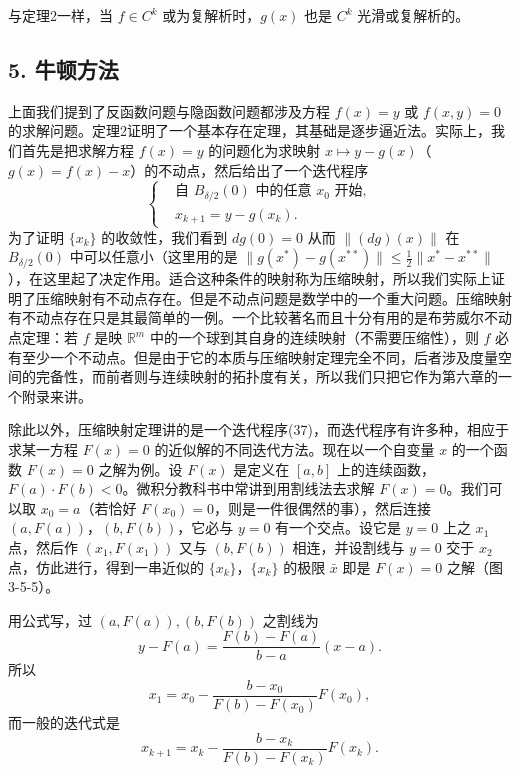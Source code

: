 与定理2一样，当 $f\in C^k$ 或为复解析时，$g(x)$ 也是 $C^k$ 光滑或复解析的。

\subsection*{5. 牛顿方法}

上面我们提到了反函数问题与隐函数问题都涉及方程 $f(x)=y$ 或 $f(x,y)=0$ 的求解问题。定理2证明了一个基本存在定理，其基础是逐步逼近法。实际上，我们首先是把求解方程 $f(x)=y$ 的问题化为求映射 $x\mapsto y-g(x)$（$g(x)=f(x)-x$）的不动点，然后给出了一个迭代程序
\begin{equation}
 \left\{
 \begin{aligned}
 &\text{自 }B_{\delta/2}(0)\text{ 中的任意 }x_0\text{ 开始},\\
 &x_{k+1}=y-g(x_k).
 \end{aligned}
 \right.
 \tag{37}
\end{equation}
为了证明 $\{x_k\}$ 的收敛性，我们看到 $dg(0)=0$ 从而 $\|(dg)(x)\|$ 在 $B_{\delta/2}(0)$ 中可以任意小（这里用的是 $\|g(x^*)-g(x^{**})\|\le\frac12\|x^*-x^{**}\|$），在这里起了决定作用。适合这种条件的映射称为压缩映射，所以我们实际上证明了压缩映射有不动点存在。但是不动点问题是数学中的一个重大问题。压缩映射有不动点存在只是其最简单的一例。一个比较著名而且十分有用的是布劳威尔不动点定理：若 $f$ 是映 $\mathbb R^m$ 中的一个球到其自身的连续映射（不需要压缩性），则 $f$ 必有至少一个不动点。但是由于它的本质与压缩映射定理完全不同，后者涉及度量空间的完备性，而前者则与连续映射的拓扑度有关，所以我们只把它作为第六章的一个附录来讲。

除此以外，压缩映射定理讲的是一个迭代程序(37)，而迭代程序有许多种，相应于求某一方程 $F(x)=0$ 的近似解的不同迭代方法。现在以一个自变量 $x$ 的一个函数 $F(x)=0$ 之解为例。设 $F(x)$ 是定义在 $[a,b]$ 上的连续函数，$F(a)\cdot F(b)<0$。微积分教科书中常讲到用割线法去求解 $F(x)=0$。我们可以取 $x_0=a$（若恰好 $F(x_0)=0$，则是一件很偶然的事），然后连接 $(a,F(a))$，$(b,F(b))$，它必与 $y=0$ 有一个交点。设它是 $y=0$ 上之 $x_1$ 点，然后作 $(x_1,F(x_1))$ 又与 $(b,F(b))$ 相连，并设割线与 $y=0$ 交于 $x_2$ 点，仿此进行，得到一串近似的 $\{x_k\}$，$\{x_k\}$ 的极限 $\bar x$ 即是 $F(x)=0$ 之解（图3-5-5）。

用公式写，过 $(a,F(a)),(b,F(b))$ 之割线为
\[
 y-F(a)=\frac{F(b)-F(a)}{b-a}(x-a).
\]
所以
\[
 x_1=x_0-\frac{b-x_0}{F(b)-F(x_0)}F(x_0),
\]
而一般的迭代式是
\begin{equation}
 x_{k+1}=x_k-\frac{b-x_k}{F(b)-F(x_k)}F(x_k).
 \tag{38}
\end{equation}

